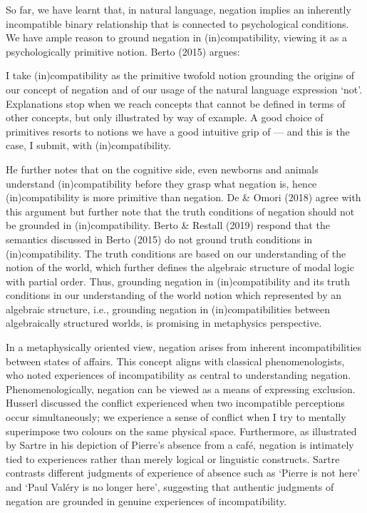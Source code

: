 So far, we have learnt that, in natural language, negation implies an inherently incompatible binary relationship that is connected to psychological conditions. We have ample reason to ground negation in (in)compatibility, viewing it as a psychologically primitive notion. Berto (2015) argues: 

I take (in)compatibility as the primitive twofold notion grounding the origins of our concept of negation and of our usage of the natural language expression ‘not’. Explanations stop when we reach concepts that cannot be defined in terms of other concepts, but only illustrated by way of example. A good choice of primitives resorts to notions we have a good intuitive grip of — and this is the case, I submit, with (in)compatibility. 

He further notes that on the cognitive side, even newborns and animals understand (in)compatibility before they grasp what negation is, hence (in)compatibility is more primitive than negation. De \& Omori (2018) agree with this argument but further note that the truth conditions of negation should not be grounded in (in)compatibility. Berto \& Restall (2019) respond that the semantics discussed in Berto (2015) do not ground truth conditions in (in)compatibility. The truth conditions are based on our understanding of the notion of the world, which further defines the algebraic structure of modal logic with partial order. Thus, grounding negation in (in)compatibility and its truth conditions in our understanding of the world notion which represented by an algebraic structure, i.e., grounding negation in (in)compatibilities between algebraically structured worlds, is promising in metaphysics perspective. 

In a metaphysically oriented view, negation arises from inherent incompatibilities between states of affairs. This concept aligns with classical phenomenologists, who noted experiences of incompatibility as central to understanding negation. Phenomenologically, negation can be viewed as a means of expressing exclusion. Husserl discussed the conflict experienced when two incompatible perceptions occur simultaneously; we experience a sense of conflict when I try to mentally superimpose two colours on the same physical space. Furthermore, as illustrated by Sartre in his depiction of Pierre's absence from a café, negation is intimately tied to experiences rather than merely logical or linguistic constructs. Sartre contrasts different judgments of experience of absence such as ‘Pierre is not here’ and ‘Paul Valéry is no longer here’, suggesting that authentic judgments of negation are grounded in genuine experiences of incompatibility. 

